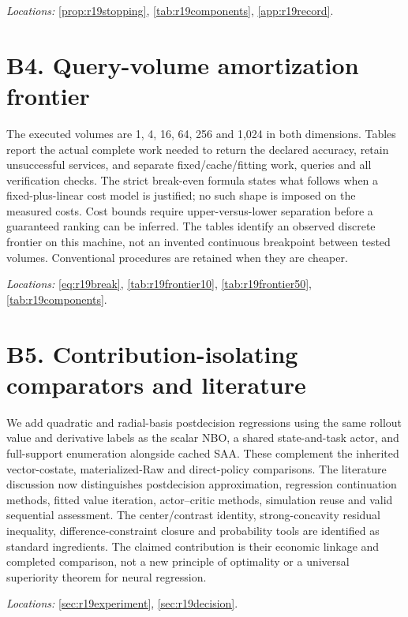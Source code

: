\documentclass[ecta,nameyear,draft]{econsocart}
\theoremstyle{definition}
\theoremstyle{remark}
\begin{document}
\noindent\emph{Locations:} \ref{prop:r19stopping}, \ref{tab:r19components}, \ref{app:r19record}.

\section*{B4. Query-volume amortization frontier}
The executed volumes are 1, 4, 16, 64, 256 and 1,024 in both dimensions. Tables report the actual complete work needed to return the declared accuracy, retain unsuccessful services, and separate fixed/cache/fitting work, queries and all verification checks. The strict break-even formula states what follows when a fixed-plus-linear cost model is justified; no such shape is imposed on the measured costs. Cost bounds require upper-versus-lower separation before a guaranteed ranking can be inferred. The tables identify an observed discrete frontier on this machine, not an invented continuous breakpoint between tested volumes. Conventional procedures are retained when they are cheaper.

\noindent\emph{Locations:} \ref{eq:r19break}, \ref{tab:r19frontier10}, \ref{tab:r19frontier50}, \ref{tab:r19components}.

\section*{B5. Contribution-isolating comparators and literature}
We add quadratic and radial-basis postdecision regressions using the same rollout value and derivative labels as the scalar NBO, a shared state-and-task actor, and full-support enumeration alongside cached SAA. These complement the inherited vector-costate, materialized-Raw and direct-policy comparisons. The literature discussion now distinguishes postdecision approximation, regression continuation methods, fitted value iteration, actor--critic methods, simulation reuse and valid sequential assessment. The center/contrast identity, strong-concavity residual inequality, difference-constraint closure and probability tools are identified as standard ingredients. The claimed contribution is their economic linkage and completed comparison, not a new principle of optimality or a universal superiority theorem for neural regression.

\noindent\emph{Locations:} \ref{sec:r19experiment}, \ref{sec:r19decision}.
\end{document}
